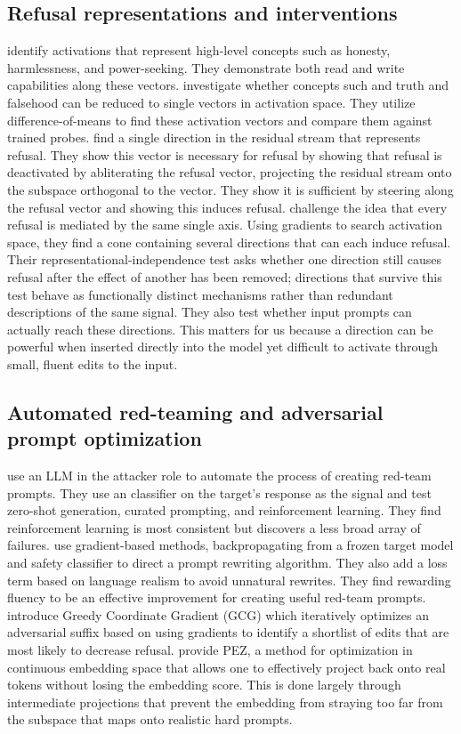 \documentclass{article}
\begin{document}
\subsection{Refusal representations and interventions}
    \citet{zou2023representation} identify activations that represent high-level concepts such as honesty, harmlessness, and power-seeking. They demonstrate both read and write capabilities along these vectors. \citet{marks2024geometry} investigate whether concepts such and truth and falsehood can be reduced to single vectors in activation space. They utilize difference-of-means to find these activation vectors and compare them against trained probes. \citet{arditi2024refusal} find a single direction in the residual stream that represents refusal. They show this vector is necessary for refusal by showing that refusal is deactivated by abliterating the refusal vector, projecting the residual stream onto the subspace orthogonal to the vector. They show it is sufficient by steering along the refusal vector and showing this induces refusal.
    \citet{wollschlager2025geometry} challenge the idea that every refusal is mediated by the same single axis. Using gradients to search activation space, they find a cone containing several directions that can each induce refusal. Their representational-independence test asks whether one direction still causes refusal after the effect of another has been removed; directions that survive this test behave as functionally distinct mechanisms rather than redundant descriptions of the same signal. They also test whether input prompts can actually reach these directions. This matters for us because a direction can be powerful when inserted directly into the model yet difficult to activate through small, fluent edits to the input.


\subsection{Automated red-teaming and adversarial prompt optimization}
  \citet{perez2022redteaming} use an LLM in the attacker role to automate the process of creating red-team prompts. They use an classifier on the target's response as the signal and test zero-shot generation, curated prompting, and reinforcement learning. They find reinforcement learning is most consistent but discovers a less broad array of failures. \citet{wichers2024gradient} use gradient-based methods, backpropagating from a frozen target model and safety classifier to direct a prompt rewriting algorithm. They also add a loss term based on language realism to avoid unnatural rewrites. They find rewarding fluency to be an effective improvement for creating useful red-team prompts. \citet{zou2023universal} introduce Greedy Coordinate Gradient (GCG) which iteratively optimizes an adversarial suffix based on using gradients to identify a shortlist of edits that are most likely to decrease refusal. \citet{wen2023hard} provide PEZ, a method for optimization in continuous embedding space that allows one to effectively project back onto real tokens without losing the embedding score. This is done largely through intermediate projections that prevent the embedding from straying too far from the subspace that maps onto realistic hard prompts.
  
\end{document}
